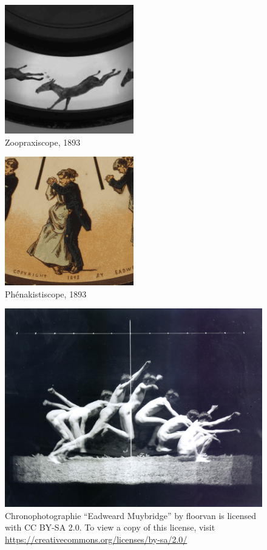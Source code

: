 \documentclass[
  french,
]{book}
\begin{document}
\begin{figure}
\centering
\includegraphics[width=0.5\textwidth,height=\textheight]{medias/corpus/muybridge/Zoopraxiscope_16485d.gif}
\caption{Zoopraxiscope, 1893}
\end{figure}

\begin{figure}
\centering
\includegraphics[width=0.5\textwidth,height=\textheight]{medias/corpus/muybridge/Phenakistoscope.gif}
\caption{Phénakistiscope, 1893}
\end{figure}

\begin{figure}
\centering
\includegraphics{medias/corpus/muybridge/3695958436_43ae8a57db_b.jpg}
\caption{Chronophotographie ``Eadweard Muybridge'' by floorvan is licensed with CC BY-SA 2.0. To view a copy of this license, visit \url{https://creativecommons.org/licenses/by-sa/2.0/}}
\end{figure}
\end{document}
